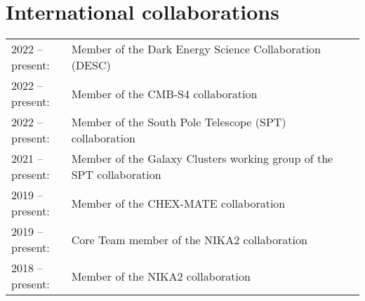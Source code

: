 \section{International collaborations}


\begin{table}[H]
    {\def\arraystretch{1.}\tabcolsep=0pt
        \begin{tabular}{p{0.17\linewidth}p{0.84\linewidth}}

    2022 -- present:
        & Member of the Dark Energy Science Collaboration (DESC) \\

    2022 -- present:
        & Member of the CMB-S4 collaboration \\

    2022 -- present:
        & Member of the South Pole Telescope (SPT) collaboration \\

    2021 -- present:
        & Member of the Galaxy Clusters working group of the SPT collaboration \\

    2019 -- present:
        & Member of the CHEX-MATE collaboration \\

    2019 -- present:
        & Core Team member of the NIKA2 collaboration \\

    2018 -- present:
        & Member of the NIKA2 collaboration

    \end{tabular}}
\end{table}
\vspace{-15pt}

